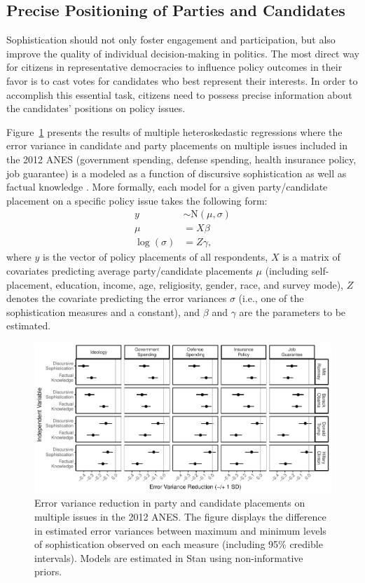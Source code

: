 \documentclass[12pt]{article}
\begin{document}
\subsection*{Precise Positioning of Parties and Candidates}

Sophistication should not only foster engagement and participation, but also improve the quality of individual decision-making in politics. The most direct way for citizens in representative democracies to influence policy outcomes in their favor is to cast votes for candidates who best represent their interests. In order to accomplish this essential task, citizens need to possess precise information about the candidates' positions on policy issues.

Figure~\ref{fig:hetreg} presents the results of multiple heteroskedastic regressions where the error variance in candidate and party placements on multiple issues included in the 2012 ANES (government spending, defense spending, health insurance policy, job guarantee) is a modeled as a function of discursive sophistication as well as factual knowledge \citep[see][for a similar procedure]{jacoby2006value}. More formally, each model for a given party/candidate placement on a specific policy issue takes the following form:
\begin{align}
y &\sim \text{N}(\mu, \sigma) \\
\mu &= X\beta \\
\log(\sigma) &= Z\gamma,
\end{align}
where $y$ is the vector of policy placements of all respondents, $X$ is a matrix of covariates predicting average party/candidate placements $\mu$ (including self-placement, education, income, age, religiosity, gender, race, and survey mode), $Z$ denotes the covariate predicting the error variances $\sigma$ (i.e., one of the sophistication measures and a constant), and $\beta$ and $\gamma$ are the parameters to be estimated.

\begin{figure}[h]\centering
\includegraphics{../fig/hetreg.pdf}
\caption{Error variance reduction in party and candidate placements on multiple issues in the 2012 ANES. The figure displays the difference in estimated error variances between maximum and minimum levels of sophistication observed on each measure (including 95\% credible intervals). Models are estimated in Stan using non-informative priors.}\label{fig:hetreg}
\end{figure}
\end{document}
